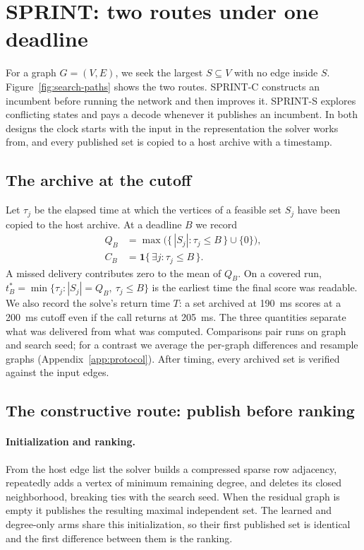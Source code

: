 \section{SPRINT: two routes under one deadline}
\label{sec:method}


For a graph \(G=(V,E)\), we seek the largest \(S\subseteq V\) with no edge inside \(S\). Figure~\ref{fig:search-paths} shows the two routes. SPRINT-C constructs an incumbent before running the network and then improves it. SPRINT-S explores conflicting states and pays a decode whenever it publishes an incumbent. In both designs the clock starts with the input in the representation the solver works from, and every published set is copied to a host archive with a timestamp.

\subsection{The archive at the cutoff}
Let \(\tau_j\) be the elapsed time at which the vertices of a feasible set \(S_j\) have been copied to the host archive. At a deadline \(B\) we record
\begin{align}
 Q_B &= \max\bigl(\{\,|S_j|:\tau_j\leq B\,\}\cup\{0\}\bigr), \label{eq:score}\\
 C_B &= \mathbf{1}\{\,\exists j:\tau_j\le B\,\}. \label{eq:coverage}
\end{align}
A missed delivery contributes zero to the mean of \(Q_B\). On a covered run, \(t_B^*=\min\{\tau_j: |S_j|=Q_B,\ \tau_j\leq B\}\) is the earliest time the final score was readable. We also record the solve's return time \(T\): a set archived at 190~ms scores at a 200~ms cutoff even if the call returns at 205~ms. The three quantities separate what was delivered from what was computed. Comparisons pair runs on graph and search seed; for a contrast we average the per-graph differences and resample graphs (Appendix~\ref{app:protocol}). After timing, every archived set is verified against the input edges.

\subsection{The constructive route: publish before ranking}
\paragraph{Initialization and ranking.}
From the host edge list the solver builds a compressed sparse row adjacency, repeatedly adds a vertex of minimum remaining degree, and deletes its closed neighborhood, breaking ties with the search seed. When the residual graph is empty it publishes the resulting maximal independent set. The learned and degree-only arms share this initialization, so their first published set is identical and the first difference between them is the ranking.

